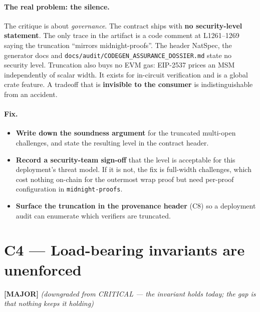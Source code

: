 \paragraph{The real problem: the silence.}
The critique is about \emph{governance}. The contract ships with
\textbf{no security-level statement}. The only trace in the artifact
is a code comment at L1261--1269 saying the truncation ``mirrors
midnight-proofs''. The header NatSpec, the generator docs and
\texttt{docs/\allowbreak{}audit/\allowbreak{}CODEGEN\_\allowbreak{}ASSURANCE\_\allowbreak{}DOSSIER.md}
state no security level. Truncation also buys no EVM gas: EIP-2537 prices
an MSM independently of scalar width. It exists for in-circuit
verification and is a global crate feature. A tradeoff that is
\textbf{invisible to the consumer} is indistinguishable from an
accident.

\paragraph{Fix.}
\begin{itemize}[leftmargin=1.4em,itemsep=2pt]
\item \textbf{Write down the soundness argument} for the truncated
  multi-open challenges, and state the resulting level in the contract
  header.
\item \textbf{Record a security-team sign-off} that the level is
  acceptable for this deployment's threat model. If it is not, the fix is
  full-width challenges, which cost nothing on-chain for the outermost
  wrap proof but need per-proof configuration in \texttt{midnight-proofs}.
\item \textbf{Surface the truncation in the provenance header}
  (C8) so a deployment audit can enumerate which verifiers are
  truncated.
\end{itemize}

\section{C4 --- Load-bearing invariants are unenforced}
\label{sec:c4-invariants}
\textcolor{mathpurple}{\textbf{[MAJOR]}}  \emph{(downgraded from
CRITICAL --- the invariant holds today; the gap is that nothing
keeps it holding)}

